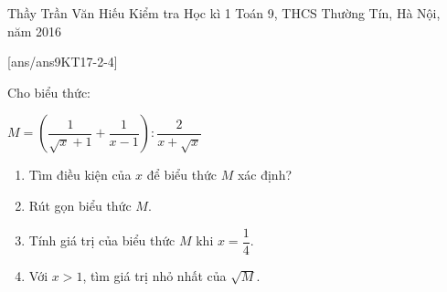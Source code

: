 \begin{name}
{Thầy  Trần Văn Hiếu}
{Kiểm tra Học kì 1 Toán 9, THCS Thường Tín, Hà Nội, năm 2016}
\end{name}
\setcounter{ex}{0}
[ans/ans9KT17-2-4]

\begin{ex}%
Cho biểu thức: 
\begin{center}
$M=\left(\dfrac{1}{\sqrt{x}+1}+\dfrac{1}{x-1} \right):\dfrac{2}{x+\sqrt{x}}$
\begin{enumerate}
\item Tìm điều kiện của $x$ để biểu thức $M$ xác định?
\item Rút gọn biểu thức $M$.
\item Tính giá trị của biểu thức $M$ khi $x=\dfrac{1}{4}$.
\item Với $x>1$, tìm giá trị nhỏ nhất của $\sqrt{M}$.
\end{enumerate}
\end{center}
\end{ex}
